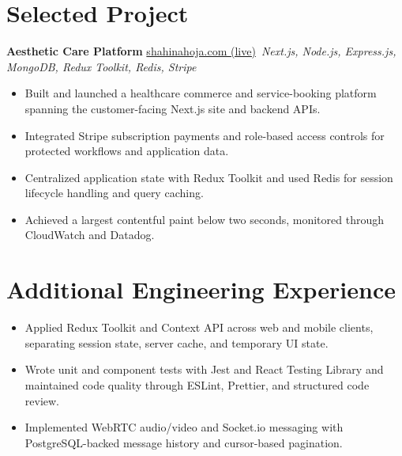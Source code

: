\documentclass[11pt,a4paper,sans]{moderncv}
\begin{document}
\vspace{3pt}


\section{Selected Project}
\vspace{1pt}
\textbf{Aesthetic Care Platform} \hfill \href{https://shahinahoja.com/}{shahinahoja.com (live)}\
\textit{Next.js, Node.js, Express.js, MongoDB, Redux Toolkit, Redis, Stripe}
\begin{itemize}
\item {Built and launched a healthcare commerce and service-booking platform spanning the customer-facing Next.js site and backend APIs.}
\item {Integrated Stripe subscription payments and role-based access controls for protected workflows and application data.}
\item {Centralized application state with Redux Toolkit and used Redis for session lifecycle handling and query caching.}
\item {Achieved a largest contentful paint below two seconds, monitored through CloudWatch and Datadog.}
\end{itemize}

\section{Additional Engineering Experience}
\vspace{1pt}
\begin{itemize}
    \item {Applied Redux Toolkit and Context API across web and mobile clients, separating session state, server cache, and temporary UI state.}
    \item {Wrote unit and component tests with Jest and React Testing Library and maintained code quality through ESLint, Prettier, and structured code review.}
    \item {Implemented WebRTC audio/video and Socket.io messaging with PostgreSQL-backed message history and cursor-based pagination.}
\end{itemize}
\end{document}
